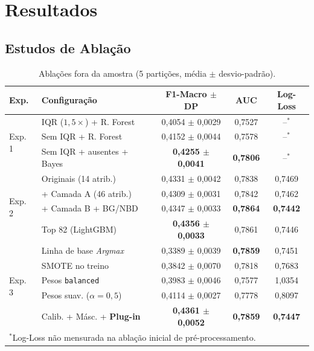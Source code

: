 \documentclass[10pt, conference, compsocconf]{IEEEtran}
\begin{document}
\section{Resultados}

\subsection{Estudos de Ablação}
\begin{table}[!t]
\centering
\caption{Ablações fora da amostra (5 partições, média $\pm$ desvio-padrão).}
\label{tab:ablacoes}
\scriptsize
\setlength{\tabcolsep}{1.7pt}
\begin{tabular}{@{}llccc@{}}
\toprule
\textbf{Exp.} & \textbf{Configuração} & \textbf{F1-Macro $\pm$ DP} & \textbf{AUC} & \textbf{Log-Loss} \\
\midrule
\multirow{3}{*}{Exp. 1}
 & IQR ($1{,}5\times$) + R. Forest & 0,4054 $\pm$ 0,0029 & 0,7527 & --$^\ast$ \\
 & Sem IQR + R. Forest & 0,4152 $\pm$ 0,0044 & 0,7578 & --$^\ast$ \\
 & Sem IQR + ausentes + Bayes & \textbf{0,4255 $\pm$ 0,0041} & \textbf{0,7806} & --$^\ast$ \\
\midrule
\multirow{4}{*}{Exp. 2}
 & Originais (14 atrib.) & 0,4331 $\pm$ 0,0042 & 0,7838 & 0,7469 \\
 & + Camada A (46 atrib.) & 0,4309 $\pm$ 0,0031 & 0,7842 & 0,7462 \\
 & + Camada B + BG/NBD & 0,4347 $\pm$ 0,0033 & \textbf{0,7864} & \textbf{0,7442} \\
 & Top 82 (LightGBM) & \textbf{0,4356 $\pm$ 0,0033} & 0,7861 & 0,7446 \\
\midrule
\multirow{5}{*}{Exp. 3}
 & Linha de base \textit{Argmax} & 0,3389 $\pm$ 0,0039 & \textbf{0,7859} & 0,7451 \\
 & SMOTE no treino & 0,3842 $\pm$ 0,0070 & 0,7818 & 0,7683 \\
 & Pesos \texttt{balanced} & 0,3983 $\pm$ 0,0046 & 0,7577 & 1,0354 \\
 & Pesos suav. ($\alpha=0{,}5$) & 0,4114 $\pm$ 0,0027 & 0,7778 & 0,8097 \\
 & Calib. + Másc. + \textbf{Plug-in} & \textbf{0,4361 $\pm$ 0,0052} & \textbf{0,7859} & \textbf{0,7447} \\
\bottomrule
\multicolumn{5}{l}{\scriptsize $^\ast$Log-Loss não mensurada na ablação inicial de pré-processamento.}
\end{tabular}
\end{table}
\end{document}
